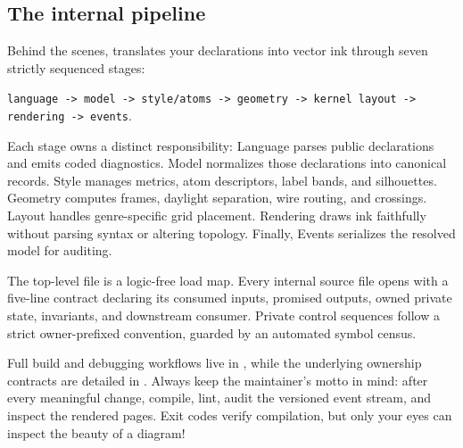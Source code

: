 \subsection{The internal pipeline}

Behind the scenes, \pkg{} translates your declarations into vector ink through
seven strictly sequenced stages:

\begin{center}
\texttt{language -> model -> style/atoms -> geometry -> kernel layout ->
rendering -> events}.
\end{center}

Each stage owns a distinct responsibility: Language parses public declarations
and emits coded diagnostics.  Model normalizes those declarations into canonical
records.  Style manages metrics, atom descriptors, label bands, and
silhouettes.  Geometry computes frames, daylight separation, wire routing, and
crossings.  Layout handles genre-specific grid placement.  Rendering draws ink
faithfully without parsing syntax or altering topology.  Finally, Events
serializes the resolved model for auditing.

The top-level file  is a logic-free load map.  Every internal
source file opens with a five-line contract declaring its consumed inputs,
promised outputs, owned private state, invariants, and downstream consumer.
Private control sequences follow a strict owner-prefixed convention, guarded by
an automated symbol census.

Full build and debugging workflows live in , while the
underlying ownership contracts are detailed in .  Always
keep the maintainer's motto in mind: after every meaningful change, compile,
lint, audit the versioned event stream, and inspect the rendered pages.  Exit
codes verify compilation, but only your eyes can inspect the beauty of a diagram!
